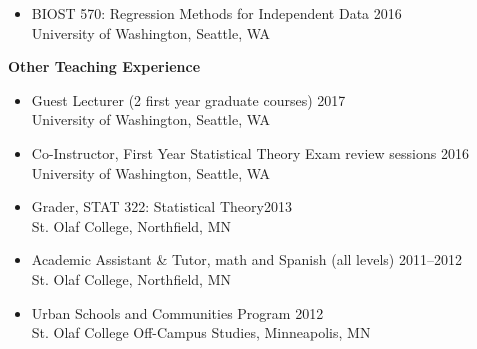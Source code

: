 \documentclass[margin]{res}
\begin{document}
\begin{resume}
\begin{itemize}
\item BIOST 570: Regression Methods for Independent Data \hfill  2016 \\
University of Washington, Seattle, WA \vspace{0.1cm} \\

\end{itemize}




\textbf{Other Teaching Experience} \vspace{0.1cm}
\begin{itemize}
\item Guest Lecturer (2 first year graduate courses) \hfill 2017 \\
University of Washington, Seattle, WA

\item Co-Instructor, First Year Statistical Theory Exam review sessions \hfill 2016 \\
University of Washington, Seattle, WA \vspace{0.1cm}

\item Grader, STAT 322: Statistical Theory\hfill  2013 \\
St. Olaf College, Northfield, MN \vspace{0.1cm}

\item Academic Assistant \& Tutor, math and Spanish (all levels) \hfill 2011--2012 \\
St. Olaf College, Northfield, MN 

\item Urban Schools and Communities Program \hfill 2012 \\
St. Olaf College Off-Campus Studies, Minneapolis, MN \\
\end{itemize}



\end{resume}
\end{document}
